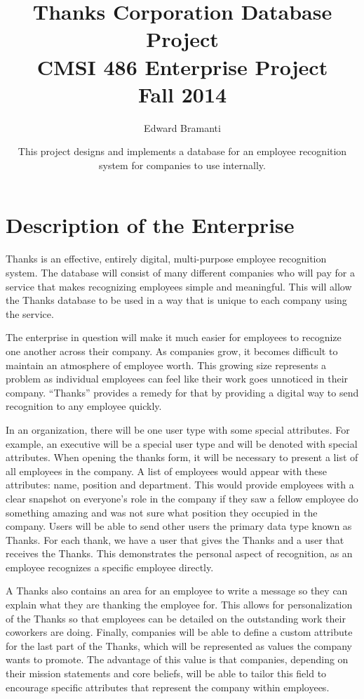 \documentclass[11pt]{report}
\title{Thanks Corporation Database Project\\CMSI 486 Enterprise Project\\Fall 2014}
\author{Edward Bramanti}
\date{This project designs and implements a database for an employee recognition system for companies to use internally.}
\providecommand\phantomsection{}
\begin{document}
\clearpage
\phantomsection
{}
\maketitle
\clearpage
\phantomsection
{}
\tableofcontents
\setcounter{page}{2}
\setcounter{chapter}{2}
\chapter{Description of the Enterprise}

Thanks is an effective, entirely digital, multi-purpose employee recognition system. The database will consist of many different companies who will pay for a service that makes recognizing employees simple and meaningful. This will allow the Thanks database to be used in a way that is unique to each company using the service.

The enterprise in question will make it much easier for employees to recognize one another across their company. As companies grow, it becomes difficult to maintain an atmosphere of employee worth. This growing size represents a problem as individual employees can feel like their work goes unnoticed in their company. “Thanks” provides a remedy for that by providing a digital way to send recognition to any employee quickly.

In an organization, there will be one user type with some special attributes. For example, an executive will be a special user type and will be denoted with special attributes. When opening the thanks form, it will be necessary to present a list of all employees in the company. A list of employees would appear with these attributes: name, position and department. This would provide employees with a clear snapshot on everyone’s role in the company if they saw a fellow employee do something amazing and was not sure what position they occupied in the company. Users will be able to send other users the primary data type known as Thanks. For each thank, we have a user that gives the Thanks and a user that receives the Thanks. This demonstrates the personal aspect of recognition, as an employee recognizes a specific employee directly.

A Thanks also contains an area for an employee to write a message so they can explain what they are thanking the employee for. This allows for personalization of the Thanks so that employees can be detailed on the outstanding work their coworkers are doing. Finally, companies will be able to define a custom attribute for the last part of the Thanks, which will be represented as values the company wants to promote. The advantage of this value is that companies, depending on their mission statements and core beliefs, will be able to tailor this field to encourage specific attributes that represent the company within employees.
\end{document}
